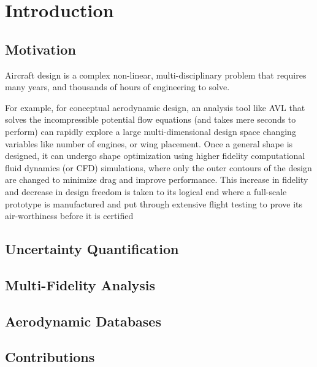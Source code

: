 \chapter{Introduction} \label{intro}

\section{Motivation}\label{intro_motivation}

Aircraft design is a complex non-linear, multi-disciplinary problem that requires many years, and thousands of hours of engineering to solve. 

For example, for conceptual aerodynamic design, an analysis tool like AVL that solves the incompressible potential flow equations (and takes mere seconds to perform) can rapidly explore a large multi-dimensional design space changing variables like number of engines, or wing placement. Once a general shape is designed, it can undergo shape optimization using higher fidelity computational fluid dynamics (or CFD) simulations, where only the outer contours of the design are changed to minimize drag and improve performance. This increase in fidelity and decrease in design freedom is taken to its logical end where a full-scale prototype is manufactured and put through extensive flight testing to prove its air-worthiness before it is certified

\section{Uncertainty Quantification} \label{intro_uq}

\section{Multi-Fidelity Analysis} \label{intro_mf}

\section{Aerodynamic Databases} \label{intro_databases}

\section{Contributions} \label{intro_contributions}

